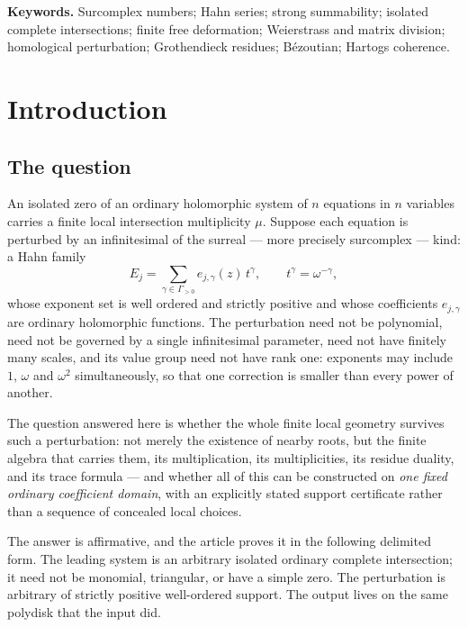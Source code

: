 \documentclass[11pt,letterpaper]{article}
\theoremstyle{definition}
\theoremstyle{remark}
\numberwithin{equation}{section}
\begin{document}
\noindent\textbf{Keywords.} Surcomplex numbers; Hahn series; strong summability; isolated complete intersections; finite free deformation; Weierstrass and matrix division; homological perturbation; Grothendieck residues; B\'ezoutian; Hartogs coherence.

\clearpage
{\small\setlength{\parskip}{0pt}\tableofcontents}
\clearpage

\section{Introduction}
\label{finite:sec:intro}

\subsection{The question}
\label{finite:sec:question}

An isolated zero of an ordinary holomorphic system of $n$ equations in $n$ variables carries a finite local intersection multiplicity $\mu$. Suppose each equation is perturbed by an infinitesimal of the surreal --- more precisely surcomplex --- kind: a Hahn family
\[
 E_j=\sum_{\gamma\in\Gamma_{>0}}e_{j,\gamma}(z)\,t^\gamma,
 \qquad t^\gamma=\omega^{-\gamma},
\]
whose exponent set is well ordered and strictly positive and whose coefficients $e_{j,\gamma}$ are ordinary holomorphic functions. The perturbation need not be polynomial, need not be governed by a single infinitesimal parameter, need not have finitely many scales, and its value group need not have rank one: exponents may include $1$, $\omega$ and $\omega^2$ simultaneously, so that one correction is smaller than every power of another.

The question answered here is whether the whole finite local geometry survives such a perturbation: not merely the existence of nearby roots, but the finite algebra that carries them, its multiplication, its multiplicities, its residue duality, and its trace formula --- and whether all of this can be constructed on \emph{one fixed ordinary coefficient domain}, with an explicitly stated support certificate rather than a sequence of concealed local choices.

The answer is affirmative, and the article proves it in the following delimited form. The leading system is an arbitrary isolated ordinary complete intersection; it need not be monomial, triangular, or have a simple zero. The perturbation is arbitrary of strictly positive well-ordered support. The output lives on the same polydisk that the input did.
\end{document}

